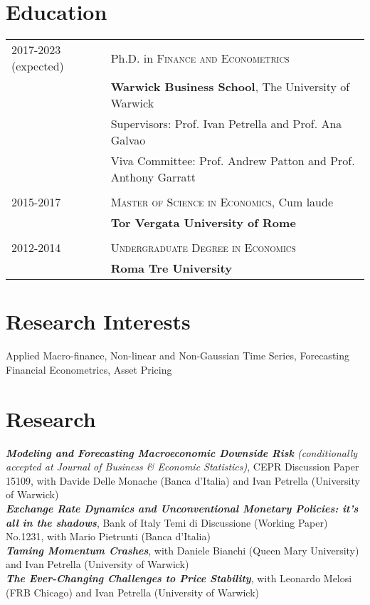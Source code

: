 \documentclass[a4paper,12pt]{article}
\begin{document}
\section{Education}
\begin{tabular}{ll}	
2017-2023 (expected) & Ph.D. in \textsc{Finance and Econometrics}\\
&\textbf{Warwick Business School}, The University of Warwick \\
&Supervisors: Prof. Ivan Petrella and Prof. Ana Galvao\\
&Viva Committee: Prof. Andrew Patton and Prof. Anthony Garratt\\
\\
2015-2017 & \textsc{Master of Science in Economics}, Cum laude\\
&\textbf{Tor Vergata University of Rome}\\
&\\
2012-2014& \textsc{Undergraduate Degree in Economics}\\ 
&\textbf{Roma Tre University}\\
\end{tabular}

\section{Research Interests}
Applied Macro-finance, Non-linear and Non-Gaussian Time Series, Forecasting\\[.5em]
Financial Econometrics, Asset Pricing

\section{Research}
\textit{\textbf{Modeling and Forecasting Macroeconomic Downside Risk} (\emph{conditionally accepted at} Journal of Business \& Economic Statistics)}, CEPR Discussion Paper 15109, with Davide Delle Monache (Banca d'Italia) and Ivan Petrella (University of Warwick)\\[.5em]
\textit{\textbf{Exchange Rate Dynamics and Unconventional Monetary Policies: it’s all in the shadows}}, Bank of Italy Temi di Discussione (Working Paper) No.1231, with Mario Pietrunti (Banca d'Italia)\\[.5em]
\textit{\textbf{Taming Momentum Crashes}}, with Daniele Bianchi (Queen Mary University) and Ivan Petrella (University of Warwick)\\[.5em]
\textit{\textbf{The Ever-Changing Challenges to Price Stability}}, with Leonardo Melosi (FRB Chicago) and Ivan Petrella (University of Warwick)
\end{document}
